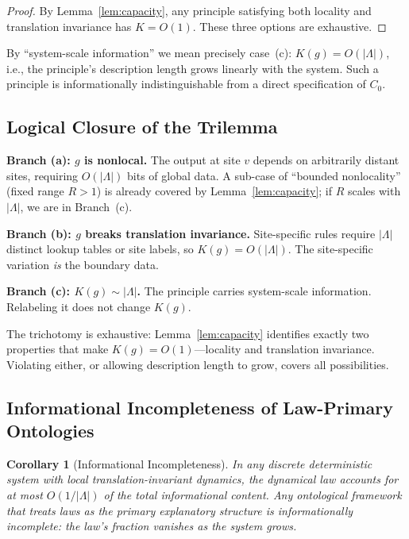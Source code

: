 \documentclass[12pt]{article}
\theoremstyle{plain}
\newtheorem{corollary}[theorem]{Corollary}
\theoremstyle{definition}
\theoremstyle{remark}
\newcommand{\Lattice}{\Lambda}
\begin{document}
\begin{proof}
By Lemma~\ref{lem:capacity}, any principle satisfying both locality and translation invariance has $K = O(1)$. These three options are exhaustive.
\end{proof}

\noindent By ``system-scale information'' we mean precisely case~(c): $K(g) = O(|\Lattice|)$, i.e., the principle's description length grows linearly with the system. Such a principle is informationally indistinguishable from a direct specification of $C_0$.

\subsection{Logical Closure of the Trilemma}

\noindent\textbf{Branch (a): $g$ is nonlocal.} The output at site $v$ depends on arbitrarily distant sites, requiring $O(|\Lattice|)$ bits of global data. A sub-case of ``bounded nonlocality'' (fixed range $R > 1$) is already covered by Lemma~\ref{lem:capacity}; if $R$ scales with $|\Lattice|$, we are in Branch~(c).

\medskip
\noindent\textbf{Branch (b): $g$ breaks translation invariance.} Site-specific rules require $|\Lattice|$ distinct lookup tables or site labels, so $K(g) = O(|\Lattice|)$. The site-specific variation \emph{is} the boundary data.

\medskip
\noindent\textbf{Branch (c): $K(g) \sim |\Lattice|$.} The principle carries system-scale information. Relabeling it does not change $K(g)$.

\medskip
The trichotomy is exhaustive: Lemma~\ref{lem:capacity} identifies exactly two properties that make $K(g) = O(1)$---locality and translation invariance. Violating either, or allowing description length to grow, covers all possibilities.

\subsection{Informational Incompleteness of Law-Primary Ontologies}

\begin{corollary}[Informational Incompleteness]\label{cor:info-incomplete}
In any discrete deterministic system with local translation-invariant dynamics, the dynamical law accounts for at most $O(1/|\Lattice|)$ of the total informational content. Any ontological framework that treats laws as the primary explanatory structure is informationally incomplete: the law's fraction vanishes as the system grows.
\end{corollary}
\end{document}
